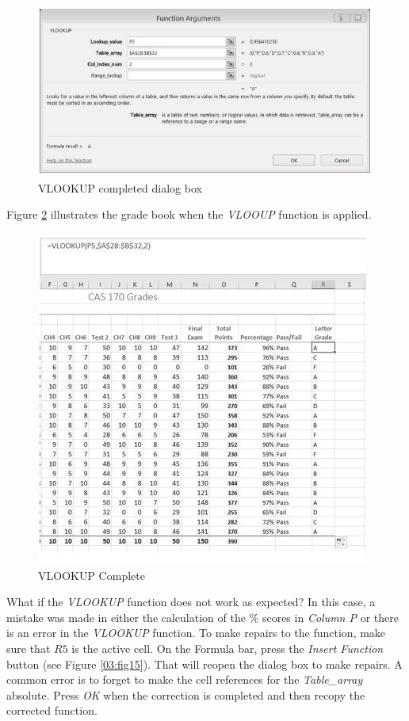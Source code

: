 \begin{figure}[H]
	\centering
	\includegraphics[width=\maxwidth{.95\linewidth}]{gfx/ch03_fig13}
	\caption{VLOOKUP completed dialog box}
	\label{03:fig13}
\end{figure}

Figure \ref{03:fig14} illustrates the grade book when the \textit{VLOOUP} function is applied.

\begin{figure}[H]
	\centering
	\includegraphics[width=\maxwidth{.95\linewidth}]{gfx/ch03_fig14}
	\caption{VLOOKUP Complete}
	\label{03:fig14}
\end{figure}

What if the \textit{VLOOKUP} function does not work as expected? In this case, a mistake was made in either the calculation of the \% scores in \textit{Column P} or there is an error in the \textit{VLOOKUP} function. To make repairs to the function, make sure that $ R5 $ is the active cell. On the Formula bar, press the \textit{Insert Function} button (see Figure \ref{03:fig15}). That will reopen the dialog box to make repairs. A common error is to forget to make the cell references for the \textit{Table\_array} absolute. Press \textit{OK} when the correction is completed and then recopy the corrected function.

